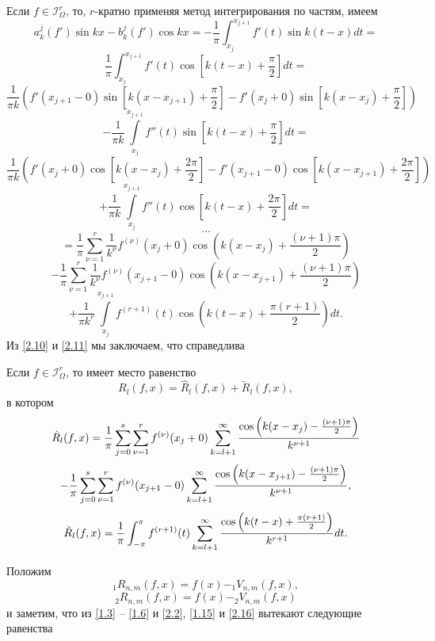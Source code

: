 Если $f\in \mathcal{ I}^r_\Omega$, то, $r$-кратно применяя метод интегрирования по частям, имеем
$$
 a_k^j(f')\sin kx-b_k^j(f')\cos kx=-\frac1\pi\int_{x_j}^{x_{j+1}}f'(t)\sin k(t-x)dt=
$$
$$
\frac1\pi\int_{x_j}^{x_{j+1}}f'(t)\cos[k(t-x)+\frac\pi2]dt=
$$
$$
\frac{1}{\pi k}(f'(x_{j+1}-0)\sin[k(x-x_{j+1})+\frac\pi2]-f'(x_j+0)\sin[k(x-x_j)+\frac\pi2])
$$
$$
-\frac1{\pi k}\int\limits_{x_j}^{x_{j+1}}f''(t)\sin[k(t-x)+\frac\pi2]dt=
$$
$$
\frac{1}{\pi k}(f'(x_j+0)\cos[k(x-x_j)+\frac{2\pi}2]-f'(x_{j+1}-0)\cos[k(x-x_{j+1})+\frac{2\pi}2])
$$
$$
+\frac1{\pi k}\int\limits_{x_j}^{x_{j+1}}f''(t)\cos[k(t-x)+\frac{2\pi}2]dt=
$$
$$
\ldots
$$
$$
=\frac{1}{\pi}
\sum_{\nu=1}^{r}\frac{1}{k^\nu}f^{(\nu)}(x_j+0)\cos\left(k(x-x_j)+\frac{(\nu+1)\pi}{2}\right)
$$
$$
-\frac{1}{\pi}
\sum_{\nu=1}^{r}\frac{1}{k^\nu} f^{(\nu)}(x_{j+1}-0)\cos\left(k(x-x_{j+1})+\frac{(\nu+1)\pi}{2}\right)
$$
\begin{equation}\label{2.11}
+\frac1{\pi k^{r}}\int\limits_{x_j}^{x_{j+1}}f^{(r+1)}(t)\cos\left(k(t-x)+\frac{\pi (r+1)}{2}\right)dt.
   \end{equation}
Из \eqref{2.10} и \eqref{2.11} мы заключаем, что справедлива
\begin{lemma}\label{l2.1}
Если $f\in \mathcal{ I}^r_\Omega$, то имеет место равенство
\begin{equation}\label{2.12}
R_l(f,x)= \hat R_l(f,x)+\tilde R_l(f,x),
   \end{equation}
в котором
$$
 \hat R_l(f,x)=\frac{1}{\pi}\sum_{j=0}^s
\sum_{\nu=1}^rf^{(\nu)}(x_j+0)\sum_{k=l+1}^\infty
{\cos\left(k(x-x_j)-\frac{(\nu+1)\pi}{2}\right)\over k^{\nu+1}}
$$
\begin{equation}\label{2.13}
-\frac{1}{\pi}\sum_{j=0}^s
\sum_{\nu=1}^r f^{(\nu)}(x_{j+1}-0)\sum_{k=l+1}^\infty
{\cos\left(k(x-x_{j+1})-\frac{(\nu+1)\pi}{2}\right)\over k^{\nu+1}},
\end{equation}
\begin{equation}\label{2.14}
\tilde R_l(f,x)=\frac1{\pi}\int_{-\pi}^{\pi}f^{(r+1)}(t)\sum_{k=l+1}^\infty
{\cos\left(k(t-x)+\frac{\pi (r+1)}{2}\right)\over k^{r+1}}dt.
\end{equation}
\end{lemma}
Положим
\begin{equation}\label{2.15}
_1R_{n,m}(f,x)=f(x)-_1V_{n,m}(f,x),
\end{equation}
\begin{equation}\label{2.16}
_2R_{n,m}(f,x)=f(x)-_2V_{n,m}(f,x)
\end{equation}
и заметим, что из \eqref{1.3} -- \eqref{1.6} и \eqref{2.2}, \eqref{1.15} и \eqref{2.16} вытекают следующие равенства
